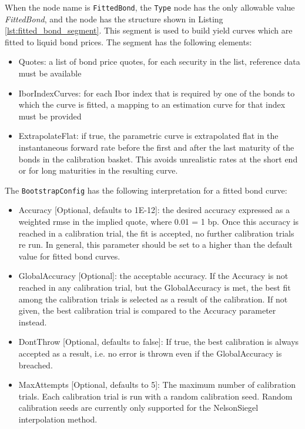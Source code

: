 When the node name is \lstinline!FittedBond!, the \lstinline!Type! node has the only allowable value \emph{FittedBond},
and the node has the structure shown in Listing \ref{lst:fitted_bond_segment}. This segment is used to build yield
curves which are fitted to liquid bond prices. The segment has the following elements:

\begin{itemize}
\item Quotes: a list of bond price quotes, for each security in the list, reference data must be available
\item IborIndexCurves: for each Ibor index that is required by one of the bonds to which the curve is fitted, a mapping
  to an estimation curve for that index must be provided
\item ExtrapolateFlat: if true, the parametric curve is extrapolated flat in the instantaneous forward rate before the
  first and after the last maturity of the bonds in the calibration basket. This avoids unrealistic rates at the short
  end or for long maturities in the resulting curve.
\end{itemize}

The \lstinline!BootstrapConfig! has the following interpretation for a fitted bond curve:

\begin{itemize}
\item Accuracy [Optional, defaults to 1E-12]: the desired accuracy expressed as a weighted rmse in the implied quote,
  where 0.01 = 1 bp. Once this accuracy is reached in a calibration trial, the fit is accepted, no further calibration
  trials re run. In general, this parameter should be set to a higher than the default value for fitted bond curves.
\item GlobalAccuracy [Optional]: the acceptable accuracy. If the Accuracy is not reached in any calibration trial, but
  the GlobalAccuracy is met, the best fit among the calibration trials is selected as a result of the calibration. If
  not given, the best calibration trial is compared to the Accuracy parameter instead.
\item DontThrow [Optional, defaults to false]: If true, the best calibration is always accepted as a result, i.e. no
  error is thrown even if the GlobalAccuracy is breached.
\item MaxAttempts [Optional, defaults to 5]: The maximum number of calibration trials. Each calibration trial is run with a random calibration
  seed. Random calibration seeds are currently only supported for the NelsonSiegel interpolation method.
\end{itemize}

